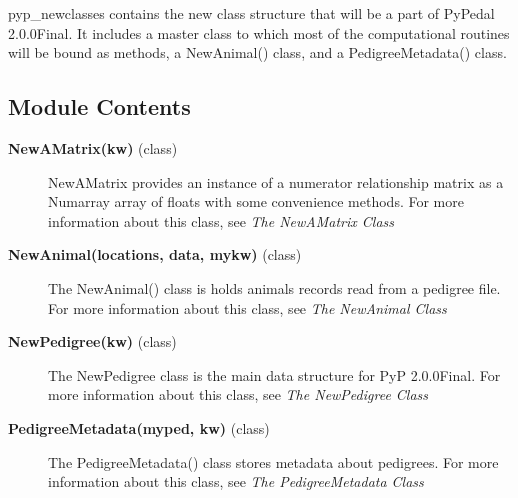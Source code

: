 pyp\_newclasses contains the new class structure that will be a part of PyPedal 2.0.0Final. It includes a master class to which most of the computational routines will be bound as methods, a NewAnimal() class, and a PedigreeMetadata() class.

\subsection*{Module Contents}

\begin{description}
\item[\textbf{NewAMatrix(kw)} (class)]
NewAMatrix provides an instance of a numerator relationship matrix as a Numarray array of floats with some convenience methods.
For more information about this class, see \emph{The NewAMatrix Class}

\item[\textbf{NewAnimal(locations, data, mykw)} (class)]
The NewAnimal() class is holds animals records read from a pedigree file.
For more information about this class, see \emph{The NewAnimal Class}

\item[\textbf{NewPedigree(kw)} (class)]
The NewPedigree class is the main data structure for PyP 2.0.0Final.
For more information about this class, see \emph{The NewPedigree Class}

\item[\textbf{PedigreeMetadata(myped, kw)} (class)]
The PedigreeMetadata() class stores metadata about pedigrees.
For more information about this class, see \emph{The PedigreeMetadata Class}
\end{description}

